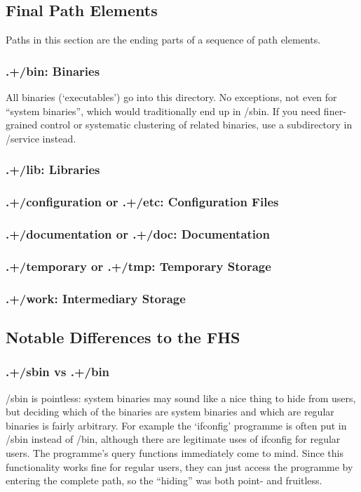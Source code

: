 \documentclass[a4paper,twoside,titlepage]{article}
\begin{document}
\subsection{Final Path Elements}
Paths in this section are the ending parts of a sequence of path elements.

\subsubsection{.+/bin: Binaries}
All binaries (`executables') go into this directory. No exceptions, not even for
``system binaries'', which would traditionally end up in /sbin. If you need
finer-grained control or systematic clustering of related binaries, use a
subdirectory in /service instead.

\subsubsection{.+/lib: Libraries}

\subsubsection{.+/configuration or .+/etc: Configuration Files}

\subsubsection{.+/documentation or .+/doc: Documentation}

\subsubsection{.+/temporary or .+/tmp: Temporary Storage}

\subsubsection{.+/work: Intermediary Storage}

\subsection{Notable Differences to the FHS}

\subsubsection{.+/sbin vs .+/bin}
/sbin is pointless: system binaries may sound like a nice thing to hide from
users, but deciding which of the binaries are system binaries and which are
regular binaries is fairly arbitrary. For example the `ifconfig' programme is
often put in /sbin instead of /bin, although there are legitimate uses of
ifconfig for regular users. The programme's query functions immediately come to
mind. Since this functionality works fine for regular users, they can just
access the programme by entering the complete path, so the ``hiding'' was both
point- and fruitless.
\end{document}
